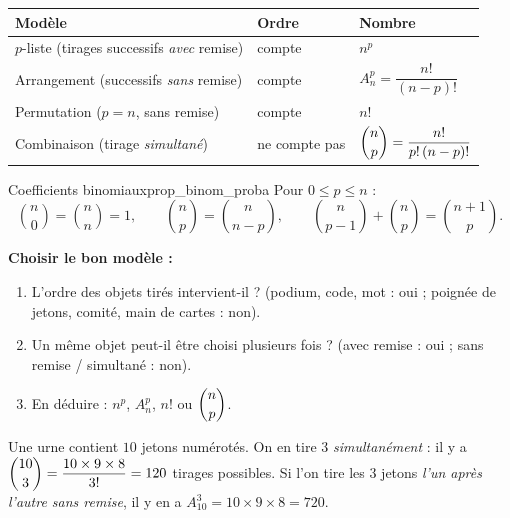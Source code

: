 \begin{theoreme}
	\begin{center}
	\renewcommand{\arraystretch}{2.2}
	\begin{tabular}{>{\raggedright\arraybackslash}p{3.5cm}
	                >{\centering\arraybackslash}p{2.6cm}
	                >{\centering\arraybackslash}p{3.4cm}}
	\hline
	\textbf{Modèle} & \textbf{Ordre} & \textbf{Nombre} \\
	\hline
	$p$-liste (tirages successifs \emph{avec} remise) & compte &
	$n^{p}$ \\
	Arrangement (successifs \emph{sans} remise) & compte &
	$A_n^{p}=\dfrac{n!}{(n-p)!}$ \\
	Permutation ($p=n$, sans remise) & compte & $n!$ \\
	Combinaison (tirage \emph{simultané}) & ne compte pas &
	$\dbinom{n}{p}=\dfrac{n!}{p!\,(n-p)!}$ \\
	\hline
	\end{tabular}
	\end{center}
\end{theoreme}

\begin{propriete}{Coefficients binomiaux}{prop_binom_proba}
	Pour $0\leqslant p\leqslant n$ :
	\[
	\binom{n}{0}=\binom{n}{n}=1,\qquad
	\binom{n}{p}=\binom{n}{n-p},\qquad
	\binom{n}{p-1}+\binom{n}{p}=\binom{n+1}{p}.
	\]
\end{propriete}

\begin{methode}
	\textbf{Choisir le bon modèle :}
	\begin{enumerate}
		\item L'ordre des objets tirés intervient-il ? (podium, code, mot :
		oui ; poignée de jetons, comité, main de cartes : non).
		\item Un même objet peut-il être choisi plusieurs fois ? (avec remise :
		oui ; sans remise / simultané : non).
		\item En déduire : $n^p$, $A_n^p$, $n!$ ou $\dbinom{n}{p}$.
	\end{enumerate}
\end{methode}

\begin{exemple}
	Une urne contient $10$ jetons numérotés. On en tire $3$ \emph{simultanément}
	: il y a $\dbinom{10}{3}=\dfrac{10\times 9\times 8}{3!}=120$ tirages
	possibles. Si l'on tire les $3$ jetons \emph{l'un après l'autre sans
	remise}, il y en a $A_{10}^{3}=10\times 9\times 8 = 720$.
\end{exemple}


